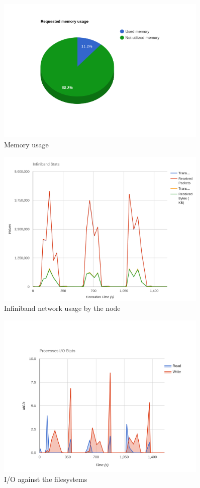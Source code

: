 \documentclass[10pt,a4paper]{report}
\begin{document}
\begin{figure}[h]
\centering
\includegraphics[width=0.9\textwidth]{img/mem.png}
\caption{Memory usage}
\end{figure}

\begin{figure}[h]
\centering
\includegraphics[width=0.9\textwidth]{img/ib.png}
\caption{Infiniband network usage by the node}
\end{figure}

\begin{figure}[h]
\centering
\includegraphics[width=0.9\textwidth]{img/io.png}
\caption{I/O against the filesystems}
\end{figure}
\end{document}
